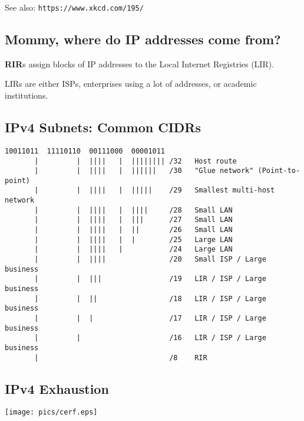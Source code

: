 \documentclass[xga]{xdvislides}
\begin{document}
See also: \verb+https://www.xkcd.com/195/+

\subsection{Mommy, where do IP addresses come from?}
\vspace*{\fill}
\begin{center}
{\bf RIR}s assign blocks of IP addresses to the Local Internet Registries (LIR).
\\
\vspace{.5in}

LIRs are either ISPs, enterprises using a lot of addresses, or academic
institutions.
\end{center}
\vspace*{\fill}

\subsection{IPv4 Subnets: Common CIDRs}
\begin{verbatim}
10011011  11110110  00111000  00001011
       |         |  ||||   |  |||||||| /32   Host route
       |         |  ||||   |  ||||||   /30   "Glue network" (Point-to-point)
       |         |  ||||   |  |||||    /29   Smallest multi-host network
       |         |  ||||   |  ||||     /28   Small LAN
       |         |  ||||   |  |||      /27   Small LAN
       |         |  ||||   |  ||       /26   Small LAN
       |         |  ||||   |  |        /25   Large LAN
       |         |  ||||   |           /24   Large LAN
       |         |  ||||               /20   Small ISP / Large business
       |         |  |||                /19   LIR / ISP / Large business
       |         |  ||                 /18   LIR / ISP / Large business
       |         |  |                  /17   LIR / ISP / Large business
       |         |                     /16   LIR / ISP / Large business
       |                               /8    RIR
\end{verbatim}

\subsection{IPv4 Exhaustion}
\vspace*{\fill}
\begin{center}
	\texttt{[image: pics/cerf.eps]}
\end{center}
\vspace*{\fill}
\end{document}
